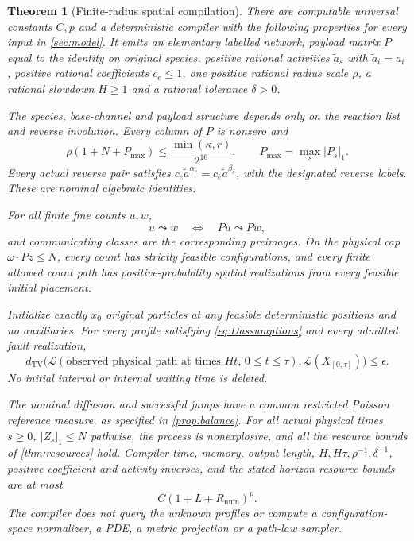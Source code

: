 \documentclass[11pt]{article}
\numberwithin{equation}{section}
\newtheorem{theorem}{Theorem}[section]
\theoremstyle{definition}
\theoremstyle{remark}\newtheorem{remark}[theorem]{Remark}
\newcommand{\TV}{d_{\mathrm{TV}}}
\newcommand{\Rnum}{R_{\mathrm{num}}}
\begin{document}
\begin{theorem}[Finite-radius spatial compilation]\label{thm:main}
There are computable universal constants $C,p$ and a deterministic compiler
with the following properties for every input in \cref{sec:model}.
It emits an elementary labelled network, payload matrix $P$ equal to the
identity on original species, positive rational activities $\widetilde a_s$
with $\widetilde a_i=a_i$, positive rational coefficients $c_e\le1$, one
positive rational radius scale $\rho$, a rational slowdown $H\ge1$ and a
rational tolerance $\delta>0$.

The species, base-channel and payload structure depends only on the reaction
list and reverse involution. Every column of $P$ is nonzero and
\begin{equation}\label{eq:radiusceiling}
 \rho(1+N+P_{\max})\le\frac{\min(\kappa,r)}{2^{16}},
 \qquad P_{\max}=\max_s|P_s|_1.
\end{equation}
Every actual reverse pair satisfies
$c_e\widetilde a^{\alpha_e}=c_{\bar e}\widetilde a^{\beta_e}$,
with the designated reverse labels. These are nominal algebraic identities.

For all finite fine counts $u,w$,
\begin{equation}\label{eq:graphmain}
 u\leadsto w\quad\Longleftrightarrow\quad Pu\leadsto Pw,
\end{equation}
and communicating classes are the corresponding preimages. On the physical
cap $\omega\cdot Pz\le N$, every count has strictly feasible configurations,
and every finite allowed count path has positive-probability spatial
realizations from every feasible initial placement.

Initialize exactly $x_0$ original particles at any feasible deterministic
positions and no auxiliaries. For every profile satisfying
\eqref{eq:Dassumptions} and every admitted fault realization,
\begin{equation}\label{eq:pathmain}
 \TV\bigl(\mathcal L(\text{observed physical path at times }Ht,
                      \,0\le t\le\tau),\mathcal L(X_{[0,\tau]})\bigr)
 \le\epsilon.
\end{equation}
No initial interval or internal waiting time is deleted.

The nominal diffusion and successful jumps have a common restricted Poisson
reference measure, as specified in \cref{prop:balance}. For all actual
physical times $s\ge0$, $|Z_s|_1\le N$ pathwise, the process is nonexplosive,
and all the resource bounds of \cref{thm:resources} hold. Compiler time,
memory, output length, $H,H\tau,\rho^{-1},\delta^{-1}$, positive coefficient
and activity inverses, and the stated horizon resource bounds are at most
\begin{equation}\label{eq:complexitymain}
 C(1+L+\Rnum)^p.
\end{equation}
The compiler does not query the unknown profiles or compute a
configuration-space normalizer, a PDE, a metric projection or a path-law
sampler.
\end{theorem}
\end{document}
